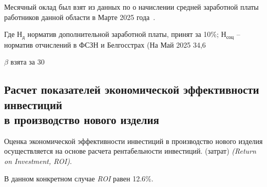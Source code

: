 

Месячный оклад был взят из данных по о начислении средней заработной
платы работников данной области в Марте 2025
года~\cite{belstat-salary}.



Где $Н_д$ норматив дополнительной заработной платы, принят за 10\%;
$Н_{соц}$ – норматив отчислений в ФСЗН и Белгосстрах (На Май 2025 34,6%



$\beta$ взята за 30%

\subsection{Расчет показателей экономической эффективности инвестиций \\
  в производство нового изделия}
 Оценка экономической эффективности инвестиций в производство нового
изделия осуществляется на основе расчета рентабельности инвестиций.
(затрат) \textit{(Return on Investment, ROI)}.


В данном конкретном случае \textit{ROI} равен 12.6\%.



\newpage


